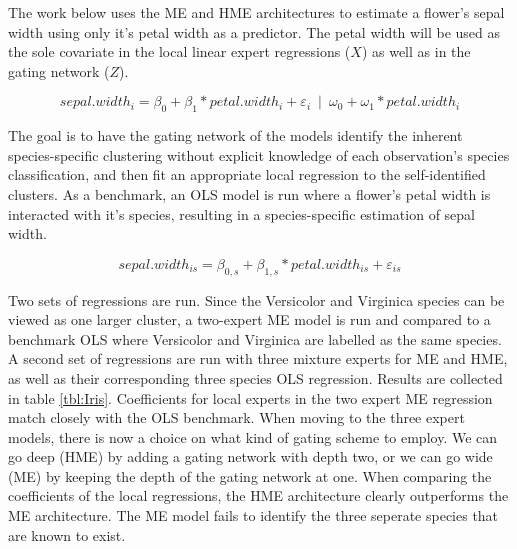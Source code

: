 \documentclass[12pt]{article}
\begin{document}
The work below uses the ME and HME architectures to estimate a flower's sepal
width using only it's petal width as a predictor. The petal width will be used
as the sole covariate in the local linear expert regressions ($X$) as well as
in the gating network ($Z$). 

\begin{equation} \label{eq:HME_iris}
    sepal.width_{i} = \beta_{0} + \beta_{1} * petal.width_{i} + \varepsilon_{i} \enspace | \enspace \omega_{0} + \omega_{1} * petal.width_{i}
\end{equation}

The goal is to have the gating network of the 
models identify the inherent species-specific clustering without explicit
knowledge of each observation's species classification, and then fit an
appropriate local regression to the self-identified clusters. As a benchmark,
an OLS model is run where a flower's petal width is interacted with it's species,
resulting in a species-specific estimation of sepal width.

\begin{equation} \label{eq:OLS_iris}
    sepal.width_{is} = \beta_{0,s} + \beta_{1, s} * petal.width_{is} + \varepsilon_{is}
\end{equation}

Two sets of regressions are run. Since the Versicolor and Virginica species
can be viewed as one larger cluster, a two-expert ME model is run
and compared to a benchmark OLS where Versicolor and Virginica are labelled
as the same species. A second set of regressions are run with three mixture
experts for ME and HME, as well as their corresponding three species OLS
regression. Results are collected in table \ref{tbl:Iris}. Coefficients for
local experts in the two expert ME regression match closely with the OLS
benchmark. When moving to the three expert models, there is now a choice
on what kind of gating scheme to employ. We can go deep (HME) by adding 
a gating network with depth two, or we can go wide (ME) by keeping the
depth of the gating network at one. When comparing the coefficients of the
local regressions, the HME architecture clearly outperforms the ME
architecture. The ME model fails to identify the three seperate
species that are known to exist.  
\end{document}
